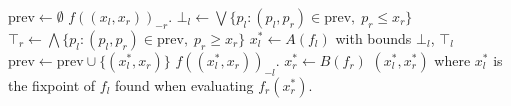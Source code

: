 \begin{algorithm}[h]
  \caption{\citep{chenLi}} \label{monDemcompAlg}
  \begin{algorithmic}[1]
    \State $\mathrm{prev} \gets \emptyset$
        \Return $f((x_l, x_r))_{-r}$.
      \EndProcedure
      \State $\bot_l \gets \bigvee\{p_l : (p_l, p_r) \in \mathrm{prev}, \; p_r \leq x_r \}$
      \State $\top_r \gets \bigwedge\{p_l : (p_l, p_r) \in \mathrm{prev}, \; p_r \geq x_r \}$
      \State $x_l^* \gets A(f_l)$ with bounds $\bot_l$, $\top_l$
      \State $\mathrm{prev} \gets \mathrm{prev} \cup \{(x_l^*, x_r)\}$
      \State \Return $f((x_l^*, x_r))_{-l}$.
    \EndProcedure
    \State $x_r^* \gets B(f_r)$
    \State \Return $(x_l^*, x_r^*)$ where $x_l^*$ is the fixpoint of $f_l$ 
    found when evaluating $f_r(x_r^*)$.
  \EndProcedure
  \end{algorithmic}
\end{algorithm}


